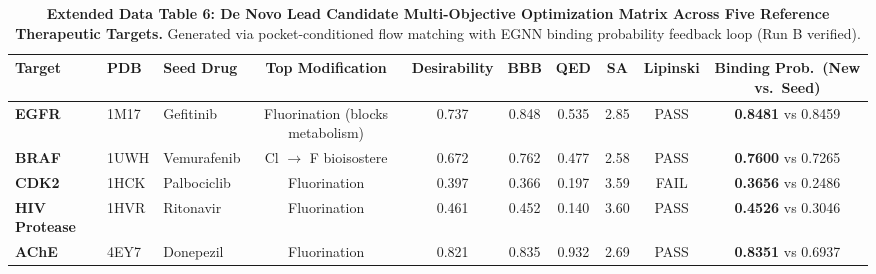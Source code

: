 \documentclass[11pt,a4paper]{article}
\begin{document}
\begin{table}[h!]
\caption{\textbf{Extended Data Table 6: De Novo Lead Candidate Multi-Objective Optimization Matrix Across Five Reference Therapeutic Targets.} Generated via pocket-conditioned flow matching with EGNN binding probability feedback loop (Run B verified).}
\label{tab:ed_denovo}
\centering
\footnotesize
\begin{tabular}{lllccccccc}
\toprule
\textbf{Target} & \textbf{PDB} & \textbf{Seed Drug} & \textbf{Top Modification} & \textbf{Desirability} & \textbf{BBB} & \textbf{QED} & \textbf{SA} & \textbf{Lipinski} & \textbf{Binding Prob.\ (New vs.\ Seed)} \\
\midrule
\textbf{EGFR} & 1M17 & Gefitinib & Fluorination (blocks metabolism) & 0.737 & 0.848 & 0.535 & 2.85 & PASS & \textbf{0.8481} vs 0.8459 \\
\textbf{BRAF} & 1UWH & Vemurafenib & Cl $\to$ F bioisostere & 0.672 & 0.762 & 0.477 & 2.58 & PASS & \textbf{0.7600} vs 0.7265 \\
\textbf{CDK2} & 1HCK & Palbociclib & Fluorination & 0.397 & 0.366 & 0.197 & 3.59 & FAIL & \textbf{0.3656} vs 0.2486 \\
\textbf{HIV Protease} & 1HVR & Ritonavir & Fluorination & 0.461 & 0.452 & 0.140 & 3.60 & PASS & \textbf{0.4526} vs 0.3046 \\
\textbf{AChE} & 4EY7 & Donepezil & Fluorination & 0.821 & 0.835 & 0.932 & 2.69 & PASS & \textbf{0.8351} vs 0.6937 \\
\bottomrule
\end{tabular}
\end{table}

\vspace{1em}
\end{document}
